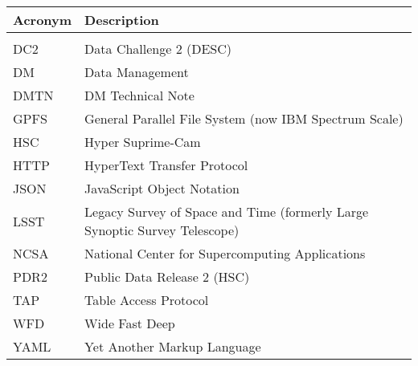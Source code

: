 \addtocounter{table}{-1}
\begin{longtable}{p{}p{}}\hline
\textbf{Acronym} & \textbf{Description}  \\\hline

 &  \\\hline
DC2 & Data Challenge 2 (DESC) \\\hline
DM & Data Management \\\hline
DMTN & DM Technical Note \\\hline
GPFS & General Parallel File System (now IBM Spectrum Scale) \\\hline
HSC & Hyper Suprime-Cam \\\hline
HTTP & HyperText Transfer Protocol \\\hline
JSON & JavaScript Object Notation \\\hline
LSST & Legacy Survey of Space and Time (formerly Large Synoptic Survey Telescope) \\\hline
NCSA & National Center for Supercomputing Applications \\\hline
PDR2 & Public Data Release 2 (HSC) \\\hline
TAP & Table Access Protocol \\\hline
WFD & Wide Fast Deep \\\hline
YAML & Yet Another Markup Language \\\hline
\end{longtable}
